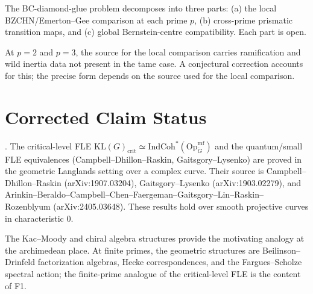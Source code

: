 \begin{remark}
\label{v4-arith:fle-audit:rem:bc-diamond-glue}
The BC-diamond-glue problem decomposes into three parts: (a) the
local BZCHN/Emerton--Gee comparison at each prime \(p\), (b)
cross-prime prismatic transition maps, and (c) global
Bernstein-centre compatibility. Each part is open.
\end{remark}

\begin{remark}
\label{v4-arith:fle-audit:rem:wild-prime}
At \(p = 2\) and \(p = 3\), the source for the local comparison
carries ramification and wild inertia data not present in the tame
case. A conjectural correction accounts for this; the precise form
depends on the source used for the local comparison.
\end{remark}

\section{Corrected Claim Status}
\label{v4-arith:fle-audit:status-matrix}

\begin{theorem}
\label{v4-arith:fle-audit:thm:geometric-fle-status}
\ClaimStatusProvedElsewhere. The critical-level FLE
\(\mathrm{KL}(G)_{\mathrm{crit}} \simeq
\mathrm{IndCoh}^{*}(\mathrm{Op}^{\mathrm{mf}}_{\check G})\) and the
quantum/small FLE equivalences (Campbell--Dhillon--Raskin,
Gaitsgory--Lysenko) are proved in the geometric Langlands setting over
a complex curve. Their source is Campbell--Dhillon--Raskin
(arXiv:1907.03204), Gaitsgory--Lysenko (arXiv:1903.02279), and
Arinkin--Beraldo--Campbell--Chen--Faergeman--Gaitsgory--Lin--Raskin--%
Rozenblyum (arXiv:2405.03648). These results hold over smooth
projective curves in characteristic \(0\).
\end{theorem}

\begin{remark}
\label{v4-arith:fle-audit:rem:chiral-scope}
The Kac--Moody and chiral algebra structures provide the motivating
analogy at the archimedean place. At finite primes, the geometric
structures are Beilinson--Drinfeld factorization algebras,
Hecke correspondences, and the Fargues--Scholze spectral action; the
finite-prime analogue of the critical-level FLE is the content of F1.
\end{remark}


